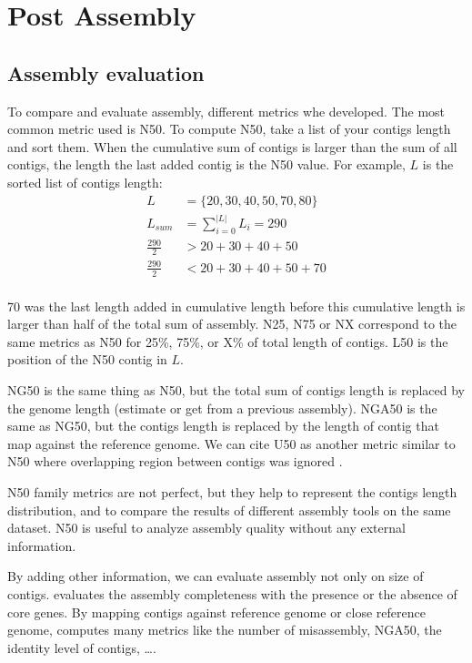 \documentclass[main.tex]{subfiles}
\begin{document}
\chapter{Post Assembly} \label{chapter:postassembly}

\section{Assembly evaluation} 

To compare and evaluate assembly, different metrics whe developed. The most common metric used is N50.
To compute N50, take a list of your contigs length and sort them. When the cumulative sum of contigs is larger than the sum of all contigs, the length the last added contig is the N50 value. For example, $L$ is the sorted list of contigs length: 
\begin{equation}
\begin{aligned}
L &= \{20, 30, 40, 50, 70, 80\} \\
L_{sum} &= \sum\limits_{i=0}^{|L|} L_i = 290 \\
\frac{290}{2} &> 20 + 30 + 40 + 50 \\
\frac{290}{2} &< 20 + 30 + 40 + 50 + 70\\
\end{aligned}
\end{equation}

70 was the last length added in cumulative length before this cumulative length is larger than half of the total sum of assembly. N25, N75 or NX correspond to the same metrics as N50 for 25\%, 75\%, or X\% of total length of contigs. L50 is the position of the N50 contig in $L$.

NG50 is the same thing as N50, but the total sum of contigs length is replaced by the genome length (estimate or get from a previous assembly). NGA50 is the same as NG50, but the contigs length is replaced by the length of contig that map against the reference genome. We can cite U50 as another metric similar to N50 where overlapping region between contigs was ignored \cite{U50}.

N50 family metrics are not perfect, but they help to represent the contigs length distribution, and to compare the results of different assembly tools on the same dataset. N50 is useful to analyze assembly quality without any external information.

By adding other information, we can evaluate assembly not only on size of contigs. \cite{busco} evaluates the assembly completeness with the presence or the absence of core genes. By mapping contigs against reference genome or close reference genome, \cite{quast} computes many metrics like the number of misassembly, NGA50, the identity level of contigs, …. 
\end{document}
